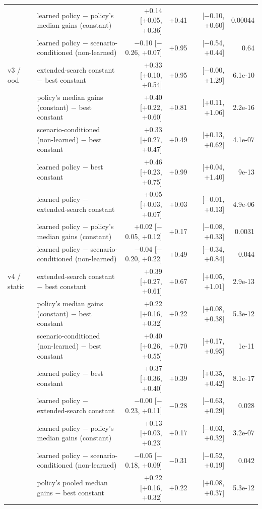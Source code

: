 \begin{table}[t]
\begin{tabular}{llrrrr}
 & learned policy $-$ policy's median gains (constant) & +0.14 [+0.05, +0.36] & +0.41 & [$-$0.10, +0.60] & 0.00044\\
 & learned policy $-$ scenario-conditioned (non-learned) & $-$0.10 [$-$0.26, +0.07] & +0.95 & [$-$0.54, +0.44] & 0.64\\
\midrule
v3 / ood & extended-search constant $-$ best constant & +0.33 [+0.10, +0.54] & +0.95 & [$-$0.00, +1.29] & 6.1e-10\\
 & policy's median gains (constant) $-$ best constant & +0.40 [+0.22, +0.60] & +0.81 & [+0.11, +1.06] & 2.2e-16\\
 & scenario-conditioned (non-learned) $-$ best constant & +0.33 [+0.27, +0.47] & +0.49 & [+0.13, +0.62] & 4.1e-07\\
 & learned policy $-$ best constant & +0.46 [+0.23, +0.75] & +0.99 & [+0.04, +1.40] & 9e-13\\
 & learned policy $-$ extended-search constant & +0.05 [+0.03, +0.07] & +0.03 & [$-$0.01, +0.13] & 4.9e-06\\
 & learned policy $-$ policy's median gains (constant) & +0.02 [$-$0.05, +0.12] & +0.17 & [$-$0.08, +0.33] & 0.0031\\
 & learned policy $-$ scenario-conditioned (non-learned) & $-$0.04 [$-$0.20, +0.22] & +0.49 & [$-$0.34, +0.84] & 0.044\\
\midrule
v4 / static & extended-search constant $-$ best constant & +0.39 [+0.27, +0.61] & +0.67 & [+0.05, +1.01] & 2.9e-13\\
 & policy's median gains (constant) $-$ best constant & +0.22 [+0.16, +0.32] & +0.22 & [+0.08, +0.38] & 5.3e-12\\
 & scenario-conditioned (non-learned) $-$ best constant & +0.40 [+0.26, +0.55] & +0.70 & [+0.17, +0.95] & 1e-11\\
 & learned policy $-$ best constant & +0.37 [+0.36, +0.40] & +0.39 & [+0.35, +0.42] & 8.1e-17\\
 & learned policy $-$ extended-search constant & $-$0.00 [$-$0.23, +0.11] & $-$0.28 & [$-$0.63, +0.29] & 0.028\\
 & learned policy $-$ policy's median gains (constant) & +0.13 [+0.03, +0.23] & +0.17 & [$-$0.03, +0.32] & 3.2e-07\\
 & learned policy $-$ scenario-conditioned (non-learned) & $-$0.05 [$-$0.18, +0.09] & $-$0.31 & [$-$0.52, +0.19] & 0.042\\
 & policy's pooled median gains $-$ best constant & +0.22 [+0.16, +0.32] & +0.22 & [+0.08, +0.37] & 5.3e-12\\

\end{tabular}
\end{table}
